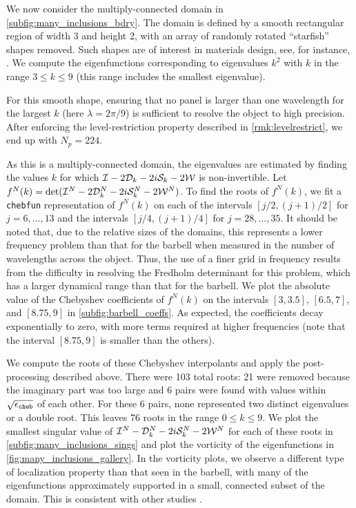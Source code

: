 We now consider the multiply-connected domain in
\cref{subfig:many_inclusions_bdry}.
% 
The domain is defined by a smooth rectangular region
of width 3 and height 2,
with an array of randomly rotated ``starfish'' shapes
removed. 
%
Such shapes are of interest in
materials design, see, for instance, \cite{overvelde2012compaction}.
%
We compute the eigenfunctions corresponding to
eigenvalues $k^2$ with $k$ in the range
$3 \leq k \leq 9$ (this range includes the smallest
eigenvalue).

%
For this smooth shape, ensuring that no panel is
larger than one wavelength for the largest $k$
(here $\lambda=2\pi/9$) is sufficient to resolve
the object to high precision.
%
After enforcing the
level-restriction property described in
\cref{rmk:levelrestrict}, we end up with
$N_p = 224$.

As this is a multiply-connected domain,
the eigenvalues are estimated by finding the values
$k$ for which $\mathcal I-2{\mathcal D}_{k}-2i{\mathcal S}_k-2{\mathcal W}$ is non-invertible.
%
Let $f^N(k) = \det (\mathcal I^N-2{\mathcal D}_{k}^N-2i{\mathcal S}_k^N-2{\mathcal W}^N)$.
To find the roots of $f^N(k)$, we fit a \texttt{chebfun}
representation of $f^N(k)$ on each of the intervals
$[j/2,(j+1)/2]$ for $j = 6,\ldots,13$ and the intervals
$[j/4,(j+1)/4]$ for $j = 28,\ldots,35$.
%
It should be noted that, due to the relative sizes
of the domains,
this represents a lower frequency problem than
that for the barbell when measured in the number
of wavelengths across the object.
%
Thus, the use of a finer grid in frequency results from
the difficulty in resolving the Fredholm determinant
for this problem, which has a larger dynamical range
than that for the barbell.
%
We plot the absolute value of the Chebyshev coefficients
of $f^N(k)$ on the intervals $[3,3.5]$, $[6.5,7]$,
and $[8.75,9]$ in \cref{subfig:barbell_coeffs}.
%
As expected, the coefficients decay exponentially
to zero, with more terms required at higher
frequencies (note that the interval $[8.75,9]$ is
smaller than the others).
%

We compute the roots of these Chebyshev interpolants
and apply the post-processing described above.
%
There were 103 total roots: 21 were removed because
the imaginary part was too large and 6 pairs were found
with values within $\sqrt{{\epsilon_{\texttt{cheb}}}}$ of each other.
%
For these 6 pairs, none represented two distinct
eigenvalues or a double root.
%
This leaves 76 roots in the range $0\leq k \leq 9$.
%
We plot the smallest singular value of
$\mathcal I^N-{\mathcal D}_{k}^N-2i{\mathcal S}_k^N-2{\mathcal W}^N$ for each of these roots in
\cref{subfig:many_inclusions_sings}
and plot the vorticity of the eigenfunctions
in \cref{fig:many_inclusions_gallery}.
%
In the vorticity plots, we observe a different type of
localization property than that seen in the barbell,
with many of the eigenfunctions
approximately supported in a small, connected subset
of the domain. This is consistent with other studies
\cite{filoche2009strong,lindsay2018boundary}.

